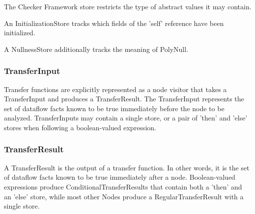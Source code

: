 
    The Checker Framework store restricts the type of abstract values it may contain.

    
    
    An InitializationStore tracks which fields of the 'self' reference have been initialized.
    
    
    A NullnessStore additionally tracks the meaning of PolyNull.
    


\subsubsection{TransferInput}
\label{sec:transfer_input_classes}

    Transfer functions are explicitly represented as a node visitor that takes a TransferInput and produces a TransferResult.  The TransferInput represents the set of dataflow facts known to be true immediately before the node to be analyzed.  TransferInputs may contain a single store, or a pair of 'then' and 'else' stores when following a boolean-valued expression.


\subsubsection{TransferResult}
\label{sec:transfer_result_classes}

    A TransferResult is the output of a transfer function.  In other words, it is the set of dataflow facts known to be true immediately after a node.  Boolean-valued expressions produce ConditionalTransferResults that contain both a 'then' and an 'else' store, while most other Nodes produce a RegularTransferResult with a single store.

